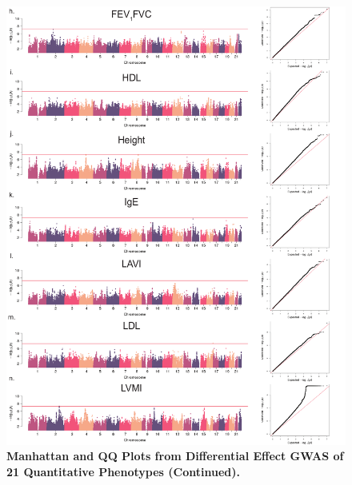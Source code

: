 \begin{figure}[!htb]
	\ContinuedFloat
	\centering
	\includegraphics[width=5in]{img/ch02/fig-s7b.pdf}
	\caption[Manhattan and QQ Plots from Differential Effect GWAS of 21 Quantitative Phenotypes (Continued). ]{\textbf{Manhattan and QQ Plots from Differential Effect GWAS of 21 Quantitative Phenotypes (Continued).} }
	\label{fig:fig-s7b}
\end{figure}



